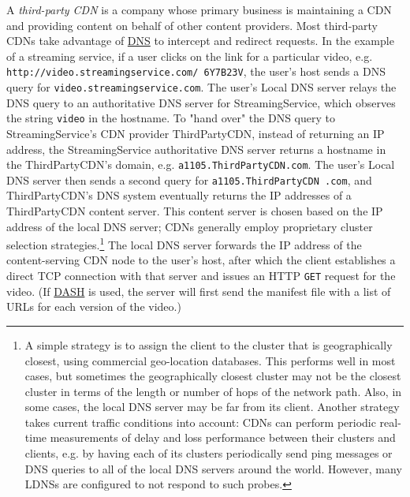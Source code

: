 \documentclass[8pt, table, xcdraw]{article}%
\begin{document}
A \emph{third-party CDN} is a company whose primary business is maintaining a CDN and providing content on behalf of other content providers. Most third-party CDNs take advantage of \hyperref[DNS]{DNS} to intercept and redirect requests. In the example of a streaming service, if a user clicks on the link for a particular video, e.g. \texttt{http://video.streamingservice.com/ 6Y7B23V}, the user’s host sends a DNS query for \texttt{video.streamingservice.com}. The user’s Local DNS server relays the DNS query to an authoritative DNS server for StreamingService, which observes the string \texttt{video} in the hostname. To "hand over" the DNS query to StreamingService's CDN provider ThirdPartyCDN, instead of returning an IP address, the StreamingService authoritative DNS server returns a hostname in the ThirdPartyCDN’s domain, e.g. \texttt{a1105.ThirdPartyCDN.com}. The user’s Local DNS server then sends a second query for \texttt{a1105.ThirdPartyCDN .com}, and ThirdPartyCDN’s DNS system eventually returns the IP addresses of a ThirdPartyCDN content server. This content server is chosen based on the IP address of the local DNS server; CDNs generally employ proprietary cluster selection strategies.\footnote{A simple strategy is to assign the client to the cluster that is geographically closest, using commercial geo-location databases. This performs well in most cases, but sometimes the geographically closest cluster may not be the closest cluster in terms of the length or number of hops of the network path. Also, in some cases, the local DNS server may be far from its client. Another strategy takes current traffic conditions into account: CDNs can perform periodic real-time measurements of delay and loss performance between their clusters and clients, e.g. by having each of its clusters periodically send ping messages or DNS queries to all of the local DNS servers around the world. However, many LDNSs are configured to not respond to such probes.} The local DNS server forwards the IP address of the content-serving CDN node to the user’s host, after which the client establishes a direct TCP connection with that server and issues an HTTP \texttt{GET} request for the video. (If \hyperref[DASH]{DASH} is used, the server will first send the manifest file with a list of URLs for each version of the video.)
\end{document}
